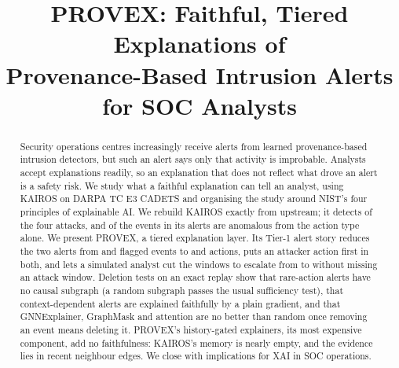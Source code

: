 \documentclass[conference]{IEEEtran}
\begin{document}
\title{PROVEX: Faithful, Tiered Explanations of\\Provenance-Based Intrusion Alerts for SOC Analysts}

\author{
\and
{}
}

\maketitle

\begin{abstract}
Security operations centres increasingly receive alerts from learned provenance-based intrusion
detectors, but such an alert says only that activity is improbable. Analysts accept explanations
readily, so an explanation that does not reflect what drove an alert is a safety risk. We study what a
faithful explanation can tell an analyst, using KAIROS on DARPA TC E3 CADETS and organising the study
around NIST's four principles of explainable AI. We rebuild KAIROS exactly from upstream; it detects
\NumAttacksDetected{} of the four attacks, and \FracPriorEvents{} of the events in its alerts are
anomalous from the action type alone. We present PROVEX, a tiered explanation layer. Its Tier-1 alert
story reduces the two alerts from \FlaggedEventsSix{} and \FlaggedEventsTwelve{} flagged events to
\StoryItemsSix{} and \StoryItemsTwelve{} actions, puts an attacker action first in both, and lets a
simulated analyst cut the windows to escalate from \TriageWindowsBefore{} to \TriageWindowsAfter{}
without missing an attack window. Deletion tests on an exact replay show that rare-action alerts have no
causal subgraph (a random subgraph passes the usual sufficiency test), that context-dependent alerts are
explained faithfully by a plain gradient, and that GNNExplainer, GraphMask and attention are no better
than random once removing an event means deleting it. PROVEX's history-gated explainers, its most
expensive component, add no faithfulness: KAIROS's memory is nearly empty, and the evidence lies in recent
neighbour edges. We close with implications for XAI in SOC operations.\end{abstract}
\end{document}
